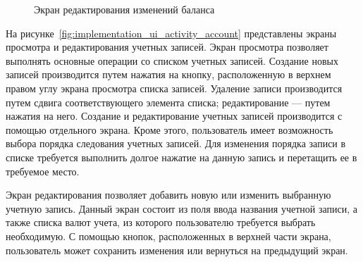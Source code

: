 \begin{figure}[h!]
  \centering
  \caption{Экран редактирования изменений баланса}
  \label{fig:implementation_ui_activity_input}
\end{figure}

На рисунке~\ref{fig:implementation_ui_activity_account}
представлены экраны просмотра и редактирования учетных записей.
Экран просмотра позволяет выполнять основные операции
со списком учетных записей.
Создание новых записей производится путем нажатия на кнопку,
расположенную в верхнем правом углу экрана просмотра списка записей.
Удаление записи производится путем сдвига соответствующего элемента списка;
редактирование --- путем нажатия на него.
Создание и редактирование учетных записей производится с помощью
отдельного экрана.
Кроме этого, пользователь имеет возможность выбора порядка следования
учетных записей. Для изменения порядка записи в списке требуется
выполнить долгое нажатие на данную запись и перетащить ее в требуемое место.

Экран редактирования позволяет добавить новую или изменить выбранную
учетную запись. Данный экран состоит из поля ввода названия учетной записи,
а также списка валют учета, из которого пользователю требуется выбрать необходимую.
С помощью кнопок, расположенных в верхней части экрана, пользователь
может сохранить изменения или вернуться на предыдущий экран.

